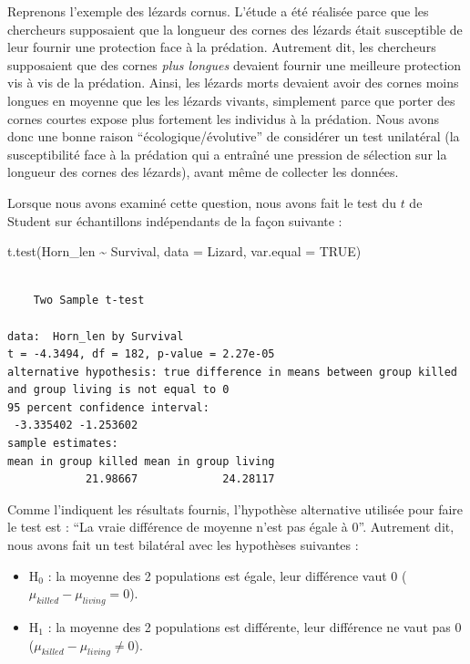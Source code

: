 \documentclass[
  a4paper,
  DIV=11,
  numbers=noendperiod,
  oneside]{scrreprt}
\newenvironment{Shaded}{}{}
\newcommand{\AttributeTok}[1]{\textcolor[rgb]{0.84,0.23,0.29}{#1}}
\newcommand{\ConstantTok}[1]{\textcolor[rgb]{0.00,0.36,0.77}{#1}}
\newcommand{\FunctionTok}[1]{\textcolor[rgb]{0.44,0.26,0.76}{#1}}
\newcommand{\NormalTok}[1]{\textcolor[rgb]{0.14,0.16,0.18}{#1}}
\newcommand{\SpecialCharTok}[1]{\textcolor[rgb]{0.00,0.36,0.77}{#1}}
\providecommand{\tightlist}{%
  \setlength{\itemsep}{0pt}\setlength{\parskip}{0pt}}\usepackage{longtable,booktabs,array}
\begin{document}
Reprenons l'exemple des lézards cornus. L'étude a été réalisée parce que
les chercheurs supposaient que la longueur des cornes des lézards était
susceptible de leur fournir une protection face à la prédation.
Autrement dit, les chercheurs supposaient que des cornes \emph{plus
longues} devaient fournir une meilleure protection vis à vis de la
prédation. Ainsi, les lézards morts devaient avoir des cornes moins
longues en moyenne que les les lézards vivants, simplement parce que
porter des cornes courtes expose plus fortement les individus à la
prédation. Nous avons donc une bonne raison ``écologique/évolutive'' de
considérer un test unilatéral (la susceptibilité face à la prédation qui
a entraîné une pression de sélection sur la longueur des cornes des
lézards), avant même de collecter les données.

Lorsque nous avons examiné cette question, nous avons fait le test du
\(t\) de Student sur échantillons indépendants de la façon suivante :

\begin{Shaded}
\begin{Highlighting}[]
\FunctionTok{t.test}\NormalTok{(Horn\_len }\SpecialCharTok{\textasciitilde{}}\NormalTok{ Survival, }\AttributeTok{data =}\NormalTok{ Lizard, }\AttributeTok{var.equal =} \ConstantTok{TRUE}\NormalTok{)}
\end{Highlighting}
\end{Shaded}

\begin{verbatim}

    Two Sample t-test

data:  Horn_len by Survival
t = -4.3494, df = 182, p-value = 2.27e-05
alternative hypothesis: true difference in means between group killed and group living is not equal to 0
95 percent confidence interval:
 -3.335402 -1.253602
sample estimates:
mean in group killed mean in group living 
            21.98667             24.28117 
\end{verbatim}

Comme l'indiquent les résultats fournis, l'hypothèse alternative
utilisée pour faire le test est : ``La vraie différence de moyenne n'est
pas égale à 0''. Autrement dit, nous avons fait un test bilatéral avec
les hypothèses suivantes :

\begin{itemize}
\tightlist
\item
  H\(_0\) : la moyenne des 2 populations est égale, leur différence vaut
  0 (\(\mu_{killed}-\mu_{living} = 0\)).
\item
  H\(_1\) : la moyenne des 2 populations est différente, leur différence
  ne vaut pas 0 (\(\mu_{killed}-\mu_{living} \neq 0\)).
\end{itemize}
\end{document}
